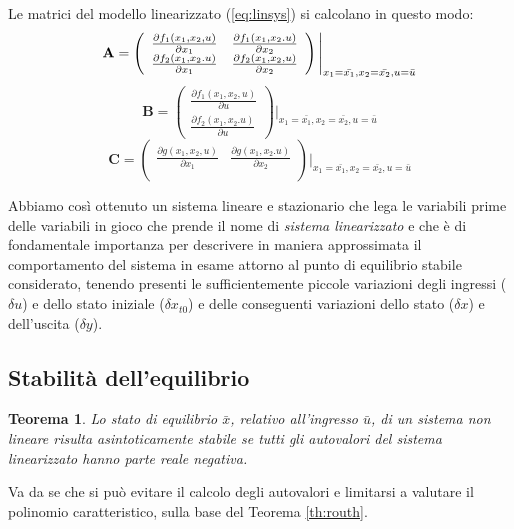 \documentclass[a4paper]{report}
\newtheorem{teorema}{Teorema}
\begin{document}
Le matrici del modello linearizzato (\ref{eq:linsys}) si calcolano in
questo modo: 
\begin{displaymath}\label{eq:matrix}
\mathbf{A} =
\left( \begin{array}{cc}
\frac{\partial f_1(x_1,x_2,u)}{\partial x_1}  & \frac{\partial f_1(x_1,x_2.u)}{\partial x_2} \\
\frac{\partial f_2(x_1,x_2.u)}{\partial x_1}  & \frac{\partial f_2(x_1,x_2,u)}{\partial x_2} \\
\end{array} \right)\Bigg |_{x_1=\bar{x_1},x_2=\bar{x_2},u=\bar{u}}\\
\end{displaymath}
\begin{displaymath}
\mathbf{B} =
\left( \begin{array}{c}
\frac{\partial f_1(x_1,x_2,u)}{\partial u}\\
\frac{\partial f_2(x_1,x_2.u)}{\partial u} 
\end{array} \right)\Bigg |_{x_1=\bar{x_1},x_2=\bar{x_2},u=\bar{u}}
\end{displaymath}
\begin{displaymath}
\mathbf{C} =
\left( \begin{array}{cc}
\frac{\partial g(x_1,x_2,u)}{\partial x_1}  & \frac{\partial g(x_1,x_2.u)}{\partial x_2} \\
\end{array} \right)\Bigg |_{x_1=\bar{x_1},x_2=\bar{x_2},u=\bar{u}}
\end{displaymath}

Abbiamo cos\`i ottenuto un sistema lineare e stazionario che lega le
variabili prime delle variabili in gioco che prende il nome di {\em
  sistema linearizzato} e che \`e di fondamentale importanza per
descrivere in maniera approssimata il comportamento del sistema in
esame attorno al punto di equilibrio stabile considerato, tenendo
presenti le sufficientemente piccole variazioni degli ingressi
($\delta{u}$) e dello stato iniziale ($\delta{x_{t0}}$) e delle
conseguenti variazioni dello stato ($\delta{x}$) e dell'uscita
($\delta{y}$).

\subsection{Stabilit\`a dell'equilibrio}
\begin{teorema}
  Lo stato di equilibrio $\bar{x}$, relativo all'ingresso $\bar{u}$, di un
  sistema non lineare risulta asintoticamente stabile se tutti gli
  autovalori del sistema linearizzato hanno parte reale negativa.
\end{teorema}
Va da se che si pu\`o evitare il calcolo degli autovalori e limitarsi a
valutare il polinomio caratteristico, sulla base del Teorema \ref{th:routh}.
\end{document}
